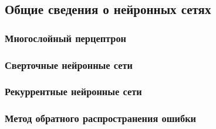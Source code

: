 \subsection{Общие сведения о нейронных сетях}
\subsubsection{Многослойный перцептрон}
\subsubsection{Сверточные нейронные сети}
\subsubsection{Рекуррентные нейронные сети}
\subsubsection{Метод обратного распространения ошибки}
